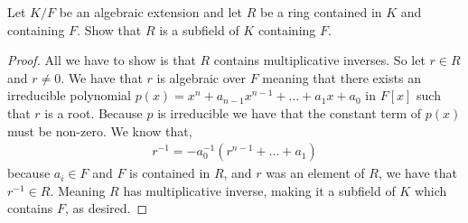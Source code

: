 \documentclass[11pt]{article}
\newenvironment{problem}[2][Problem\!]{\begin{tcolorbox}\begin{trivlist}
\item[\hskip \labelsep {\bfseries #1}\hskip \labelsep {\bfseries #2}]}{\end{trivlist}\end{tcolorbox}}
\begin{document}
\begin{problem}{13.2.16}
    Let $K/F$ be an algebraic extension and let $R$ be a ring contained in $K$ and containing $F$. Show that $R$ is a subfield of $K$ containing $F$. 
\end{problem}
\begin{proof}
    All we have to show is that $R$ contains multiplicative inverses. So let $r \in R$ and $r \neq 0$. We have that $r$ is algebraic over $F$ meaning that there exists an irreducible polynomial $p(x) = x^{n} + a_{n-1}x^{n-1} + \dots + a_1x + a_0$ in $F[x]$ such that $r$ is a root. Because $p$ is irreducible we have that the constant term of $p(x)$ must be non-zero. We know that,
    \begin{align}
        r^{-1} = -a_0^{-1}(r^{n-1} + \dots + a_1)
    \end{align}
    because $a_i \in F$ and $F$ is contained in $R$, and $r$ was an element of $R$, we have that $r^{-1} \in R$. Meaning $R$ has multiplicative inverse, making it a subfield of $K$ which contains $F$, as desired. 
\end{proof}
\end{document}

